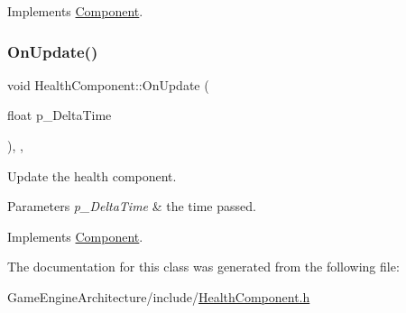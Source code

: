 Implements \mbox{\hyperlink{class_component_a1cd106256bf1791f9c6ab347776c7788}{Component}}.

\mbox{\label{class_health_component_a525bed56c917ce36bbfb67264350e56a}} 
\subsubsection{\texorpdfstring{OnUpdate()}{OnUpdate()}}
{\footnotesize\ttfamily void Health\+Component\+::\+On\+Update (\begin{DoxyParamCaption}\item[{float}]{p\+\_\+\+Delta\+Time }\end{DoxyParamCaption})\hspace{0.3cm}{\ttfamily [inline]}, {\ttfamily [override]}, {\ttfamily [virtual]}}



Update the health component. 


\begin{DoxyParams}{Parameters}
{\em p\+\_\+\+Delta\+Time} & the time passed. \\
\hline
\end{DoxyParams}


Implements \mbox{\hyperlink{class_component_ac080e9fa054949464c796b65a4b26b93}{Component}}.



The documentation for this class was generated from the following file\+:\begin{DoxyCompactItemize}
\item 
Game\+Engine\+Architecture/include/\mbox{\hyperlink{_health_component_8h}{Health\+Component.\+h}}\end{DoxyCompactItemize}
